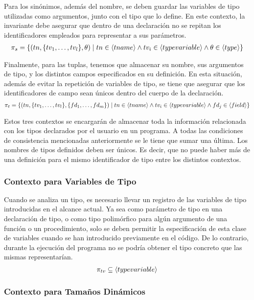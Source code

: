 Para los sinónimos, además del nombre, se deben guardar las variables de tipo utilizadas como argumentos, junto con el tipo que lo define.
En este contexto, la invariante debe asegurar que dentro de una declaración no se repitan los identificadores empleados para representar a sus parámetros.
\begin{gather*}
\pi_{s} =
\{
(tn, \{ tv_1, \ldots, tv_l \} , \theta) \mid 
tn \in \langle tname \rangle
\wedge
tv_i \in \langle typevariable \rangle
\wedge
\theta \in \langle type \rangle
\}
\end{gather*}

Finalmente, para las tuplas, tenemos que almacenar su nombre, sus argumentos de tipo, y los distintos campos especificados en su definición.
En esta situación, además de evitar la repetición de variables de tipo, se tiene que asegurar que los identificadores de campo sean únicos dentro del cuerpo de la declaración.
\begin{gather*}
\pi_{t} =
\{
(tn, \{ tv_1, \ldots, tv_l \}, \{ fd_1, \ldots, fd_m \} ) \mid
tn \in \langle tname \rangle 
\wedge
tv_i \in \langle typevariable \rangle
\wedge
fd_j \in \langle field \rangle
\}
\end{gather*}

Estos tres contextos se encargarán de almacenar toda la información relacionada con los tipos declarados por el usuario en un programa.
A todas las condiciones de consistencia mencionadas anteriormente se le tiene que sumar una última.
Los nombres de tipos definidos deben ser únicos.
Es decir, que no puede haber más de una definición para el mismo identificador de tipo entre los distintos contextos.

\subsubsection{Contexto para Variables de Tipo}

Cuando se analiza un tipo, es necesario llevar un registro de las variables de tipo introducidas en el alcance actual.
Ya sea como parámetro de tipo en una declaración de tipo, o como tipo polimórfico para algún argumento de una función o un procedimiento, solo se deben permitir la especificación de esta clase de variables cuando se han introducido previamente en el código.
De lo contrario, durante la ejecución del programa no se podría obtener el tipo concreto que las mismas representarían.
\begin{gather*}
\pi_{tv} \subseteq \langle typevariable \rangle
\end{gather*}

\subsubsection{Contexto para Tamaños Dinámicos}

